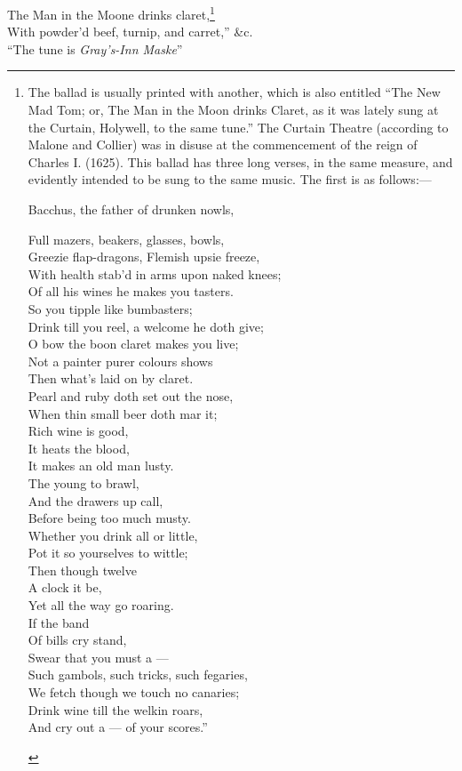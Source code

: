 \begin{scverse}
The Man in the Moone drinks claret,\footnote{\textit{}
The ballad is usually printed with another, which is also
entitled “The New Mad Tom; or, The Man in the Moon
drinks Claret, as it was lately sung at the Curtain, Holywell, 
to the same tune.” The Curtain Theatre (according
to Malone and Collier) was in disuse at the commencement
of the reign of Charles I. (1625). This ballad has
three long verses, in the same measure, and evidently intended
to be sung to the same music. The first is as
follows:—
\settowidth{\versewidth}{Bacchus, the father of drunken nowls,}
\begin{fnverse}
Bacchus, the father of drunken nowls,\\
\begin{patverse}
Full mazers, beakers, glasses, bowls,\\
Greezie flap-dragons, Flemish upsie freeze,\\
With health stab’d in arms upon naked knees;\\
Of all his wines he makes you tasters.\\
So you tipple like bumbasters;\\
Drink till you reel, a welcome he doth give;\\
O bow the boon claret makes you live;\\
Not a painter purer colours shows\\
Then what’s laid on by claret.\\
Pearl and ruby doth set out the nose,\\
When thin small beer doth mar it;\\
Rich wine is good,\\
It heats the blood,\\
It makes an old man lusty.\\
The young to brawl,\\
And the drawers up call,\\
Before being too much musty.\\
Whether you drink all or little,\\
Pot it so yourselves to wittle;\\
Then though twelve\\
A clock it be,\\
Yet all the way go roaring.\\
If the band\\
Of bills cry stand,\\
Swear that you must a ---\\
Such gambols, such tricks, such fegaries,\\
We fetch though we touch no canaries;\\
Drink wine till the welkin roars,\\
And cry out a --- of your scores.”
\end{patverse}
\end{fnverse}}\\
With powder'd beef, turnip, and carret,” \&c.\\
\attribution “The tune is \textit{Gray's-Inn Maske}”
\end{scverse}
